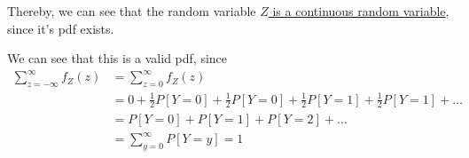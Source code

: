 Thereby, we can see that the random variable \underline{\( Z \) is a continuous random variable}, since it's pdf exists.

We can see that this is a valid pdf, since
\begin{align*}
    \sum_{z=-\infty}^{\infty} f_{Z}(z)
     & =
    \sum_{z=0}^{\infty} f_{Z}(z)
    \\ & =
    0 + \frac{1}{2} P[Y = 0] + \frac{1}{2} P[Y = 0] + \frac{1}{2} P[Y = 1] + \frac{1}{2} P[Y = 1] + \ldots
    \\ & =
    P[Y = 0] + P[Y = 1] + P[Y = 2] + \ldots
    \\ & =
    \sum_{y=0}^{\infty} P[Y = y]
    =
    1
\end{align*}
